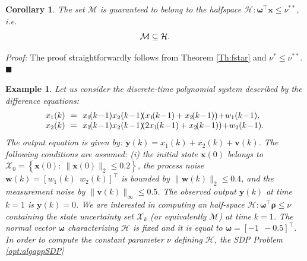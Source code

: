 \documentclass[twocolumn]{autart}
\newtheorem{example}{Example} {\normalfont}{\normalfont}
\newtheorem{corollary}{Corollary}
\newenvironment*{proof}{\emph{Proof:}}{}
\newcommand{\xhyp}{\mathbf{\rho}}
\begin{document}
\begin{corollary}
\label{co:1}
The set $\mathcal{M}$ is guaranteed to belong to the halfspace $\mathcal{H}:\boldsymbol{\omega}^\top \mathbf{x} \leq \nu^{**}$, i.e.
 \begin{equation}
 \mathcal{M} \subseteq \mathcal{H}.\\
 \end{equation}
\end{corollary}

\begin{proof}
The proof straightforwardly follows from  Theorem \ref{Th:fstar} and $\nu^* \leq  \nu^{**}$. \hfill $\blacksquare$
\end{proof}


\begin{example}
 \label{ex:1}
Let us consider the discrete-time polynomial system described by the difference equations:
\begin{equation}
\label{eq:ex1sys}
\begin{array}[pos]{rcl}
   x_1(k)&\!\!=\!\!& x_1\!(k\!-\!1)x_2(k\!-\!1)\!(x_1\!(k\!-\!1)+x_2\!(k\!-\!1)) \!+\!w_1(k\!-\!1),\\
   x_2(k)&\!\!=\!\!& x_1\!(k\!-\!1)x_2(k\!-\!1)\!(2x_1\!(k\!-\!1)+x_2\!(k\!-\!1))\! +\! w_2(k\!-\!1).\\
\end{array}
\end{equation}
The output equation is given by:
$
\mathbf{y}(k)=x_1(k)+x_2(k)+\mathbf{v}(k)$.
The following conditions are assumed: (i) the initial state $\mathbf{x}(0)$ belongs to $\mathcal{X}_0=\left\{\mathbf{x}(0):~\|\mathbf{x}(0)\|_{2} \leq  0.2\right\}$, the process noise  $\mathbf{w}(k)=[w_1(k) \ \ w_2(k)]^\top$ is bounded by $\|\mathbf{w}(k)\|_{2} \leq 0.4$, and
the measurement noise by $\|\mathbf{v}(k)\|_{\infty} \leq 0.5$. The observed output $\mathbf{y}(k)$ at time $k=1$ is $\mathbf{y}(k)=0$.
 We are interested in computing an half-space $\mathcal{H}:\boldsymbol{\omega}^\top \xhyp \leq \nu$ containing the state uncertainty set $\mathcal{X}_k$ (or equivalently $\mathcal{M}$) at time $k=1$. The normal vector $\boldsymbol{\omega}$ characterizing $\mathcal{H}$ is fixed and it is equal to $\boldsymbol{\omega}=[-1 \ \ -0.5]^\top$.  In order to compute the constant parameter $\nu$ defining $\mathcal{H}$, the SDP   Problem \eqref{opt:algappSDP}

\end{example}
\end{document}
